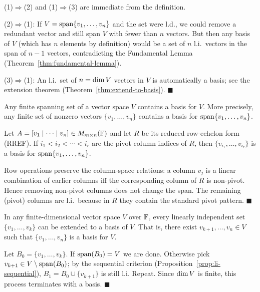 \begin{proofbox}
(1)$\Rightarrow$(2) and (1)$\Rightarrow$(3) are immediate from the definition.

(2)$\Rightarrow$(1): If $V=\operatorname{span}\{v_1,\ldots,v_n\}$ and the set were l.d., we
could remove a redundant vector and still span $V$ with fewer than $n$ vectors.
But then any basis of $V$ (which has $n$ elements by definition) would be a
set of $n$ l.i.\ vectors in the span of $n-1$ vectors, contradicting the
Fundamental Lemma (Theorem~\ref{thm:fundamental-lemma}).

(3)$\Rightarrow$(1): An l.i.\ set of $n=\operatorname{dim} V$ vectors in $V$ is
automatically a basis; see the extension theorem
(Theorem~\ref{thm:extend-to-basis}).
\hfill$\blacksquare$
\end{proofbox}

\begin{thmbox}
\label{thm:basis-subset}
Any finite spanning set of a vector space $V$ contains a basis for $V$.
More precisely, any finite set of nonzero vectors $\{v_1,\ldots,v_n\}$
contains a basis for $\operatorname{span}\{v_1,\ldots,v_n\}$.
\end{thmbox}

\begin{propbox}
\label{prop:basis-via-rref}
Let $A=[v_1\mid\cdots\mid v_n]\in M_{m\times n}(\mathbb{F})$ and let $R$ be its reduced
row-echelon form (RREF).  If $i_1 < i_2 < \cdots < i_r$ are the pivot column
indices of $R$, then $\{v_{i_1},\ldots,v_{i_r}\}$ is a basis for
$\operatorname{span}\{v_1,\ldots,v_n\}$.
\end{propbox}

\begin{proofbox}
Row operations preserve the column-space relations: a column $v_j$ is a linear
combination of earlier columns iff the corresponding column of $R$ is
non-pivot.  Hence removing non-pivot columns does not change the span.  The
remaining (pivot) columns are l.i.\ because in $R$ they contain the standard
pivot pattern.
\hfill$\blacksquare$
\end{proofbox}

\begin{thmbox}
\label{thm:extend-to-basis}
In any finite-dimensional vector space $V$ over $\mathbb{F}$, every linearly
independent set $\{v_1,\ldots,v_k\}$ can be extended to a basis of $V$.
That is, there exist $v_{k+1},\ldots,v_n\in V$ such that
$\{v_1,\ldots,v_n\}$ is a basis for $V$.
\end{thmbox}

\begin{proofbox}
Let $B_0=\{v_1,\ldots,v_k\}$.  If $\operatorname{span}(B_0)=V$ we are done.  Otherwise
pick $v_{k+1}\in V\setminus\operatorname{span}(B_0)$; by the sequential criterion
(Proposition~\ref{prop:li-sequential}), $B_1=B_0\cup\{v_{k+1}\}$ is still
l.i.  Repeat.  Since $\operatorname{dim} V$ is finite, this process terminates with a basis.
\hfill$\blacksquare$
\end{proofbox}

